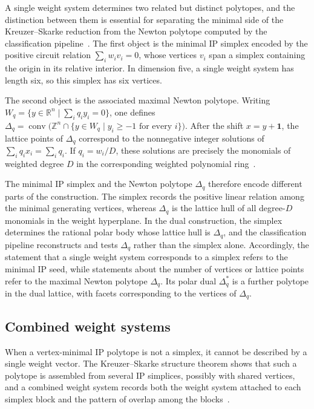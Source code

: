 \documentclass[appliedmath,article,submit,moreauthors]{Definitions/mdpi}
\newcommand{\Z}{\mathbb{Z}}
\newcommand{\RR}{\mathbb{R}}
\newcommand{\Dq}{\Delta_q}
\newcommand{\Conv}{\operatorname{conv}}
\begin{document}
A single weight system determines two related but distinct polytopes, and the
distinction between them is essential for separating the minimal side of the
Kreuzer--Skarke reduction from the Newton polytope computed by the
classification pipeline~\cite{KS97,KSFibrations2002,Scholler2019}. The first
object is the minimal IP simplex encoded by the positive circuit relation
$\sum_i w_i v_i=0$, whose vertices $v_i$ span a simplex containing the origin in
its relative interior. In dimension five, a single weight system has length six,
so this simplex has six vertices.

The second object is the associated maximal Newton polytope. Writing
$W_q=\{y\in\RR^n\mid \sum_i q_i y_i=0\}$, one defines
$\Dq=\Conv\bigl(\Z^n\cap\{y\in W_q\mid y_i\geq -1\text{ for every }i\}\bigr)$.
After the shift $x=y+\mathbf{1}$, the lattice points of $\Dq$ correspond to the
nonnegative integer solutions of $\sum_i q_i x_i=\sum_i q_i$. If $q_i=w_i/D$,
these solutions are precisely the monomials of weighted degree $D$ in the
corresponding weighted polynomial ring~\cite{Skarke1996,Conrads2002}.

The minimal IP simplex and the Newton polytope $\Dq$ therefore encode different
parts of the construction. The simplex records the positive {\color{blue}linear relation}
among the minimal generating vertices, whereas $\Dq$ is the lattice hull of all
degree-$D$ monomials in the weight hyperplane. In the dual construction, the
simplex determines the rational polar body whose lattice hull is $\Dq$, and the
classification pipeline reconstructs and tests $\Dq$ rather than the simplex
alone. Accordingly, the statement that a single weight system corresponds to a
simplex refers to the minimal IP seed, while statements about the number of
vertices or lattice points refer to the maximal Newton polytope $\Dq$. Its polar
dual $\Dq^*$ is a further polytope in the dual lattice, with facets
corresponding to the vertices of $\Dq$.


\subsection{Combined weight systems}
\label{sec:math-cws}

When a vertex-minimal IP polytope is not a simplex, it cannot be described by a
single weight vector. The Kreuzer--Skarke structure theorem shows that such a
polytope is assembled from several IP simplices, possibly with shared vertices,
and a combined weight system records both the weight system attached to each
simplex block and the pattern of overlap among the
blocks~\cite{KS97,KSFibrations2002}.
\end{document}
